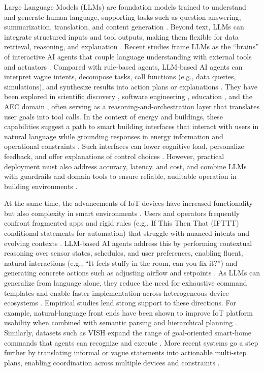 \documentclass[final,3p,times]{elsarticle}
\begin{document}
Large Language Models (LLMs) are foundation models trained to understand and generate human language, supporting tasks such as question answering, summarization, translation, and content generation \cite{chang2024survey,radford2019language}. Beyond text, LLMs can integrate structured inputs and tool outputs, making them flexible for data retrieval, reasoning, and explanation \cite{liu2023summary}. Recent studies frame LLMs as the “brains” of interactive AI agents that couple language understanding with external tools and actuators \cite{xi2023rise,zhao2023depth}. Compared with rule-based agents, LLM-based AI agents can interpret vague intents, decompose tasks, call functions (e.g., data queries, simulations), and synthesize results into action plans or explanations \cite{zhao2023depth,jiang2024eplus}. They have been explored in scientific discovery \cite{li2023you,boiko2023emergent}, software engineering \cite{xi2023rise}, education \cite{liu2023summary}, and the AEC domain \cite{saka2023conversational}, often serving as a reasoning-and-orchestration layer that translates user goals into tool calls. In the context of energy and buildings, these capabilities suggest a path to smart building interfaces that interact with users in natural language while grounding responses in energy information and operational constraints \cite{jiang2024eplus}. Such interfaces can lower cognitive load, personalize feedback, and offer explanations of control choices \cite{michelon2025large}. However, practical deployment must also address accuracy, latency, and cost, and combine LLMs with guardrails and domain tools to ensure reliable, auditable operation in building environments \cite{liu2025large}. 

At the same time, the advancements of IoT devices have increased functionality but also complexity in smart environments \cite{guo2019review}. Users and operators frequently confront fragmented apps and rigid rules (e.g., If This Then That (IFTTT) conditional statements for automation) that struggle with nuanced intents and evolving contexts \cite{king2023get}. LLM-based AI agents address this by performing contextual reasoning over sensor states, schedules, and user preferences, enabling fluent, natural interactions (e.g., “It feels stuffy in the room, can you fix it?”) and generating concrete actions such as adjusting airflow and setpoints \cite{rivkin2024aiot}. As LLMs can generalize from language alone, they reduce the need for exhaustive command templates and enable faster implementation across heterogeneous device ecosystems \cite{king2024sasha}. Empirical studies lend strong support to these directions. For example, natural-language front ends have been shown to improve IoT platform usability when combined with semantic parsing and hierarchical planning \cite{rivkin2024aiot,xu2022building}. Similarly, datasets such as VISH expand the range of goal-oriented smart-home commands that agents can recognize and execute \cite{noura2020vish}. More recent systems go a step further by translating informal or vague statements into actionable multi-step plans, enabling coordination across multiple devices and constraints \cite{king2024sasha}.
\end{document}
